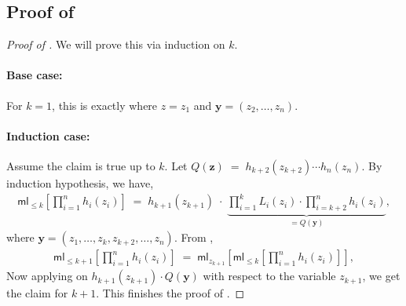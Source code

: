 \documentclass[11pt]{article}
\newcommand{\brac}[1]{\left[ #1 \right]}
\newcommand{\ml}{\mathsf{ml}}
\begin{document}
\subsection{Proof of }\label{app:claim-partial-uni}

\partialmlproduni*

\begin{proof}[Proof of ]
We will prove this via induction on $k$.

\paragraph{Base case:}For $k = 1$, this is exactly  where $z = z_{1}$ and $\mathbf{y} = (z_{2},\ldots,z_{n})$.

\paragraph{Induction case:}Assume the claim is true up to $k$. Let $Q(\mathbf{z}) \; = \; h_{k+2}(z_{k+2}) \cdots h_{n}(z_{n})$. By induction hypothesis, we have,
\begin{align*}
    \ml_{\leq k}\brac{\prod_{i=1}^{n} h_{i}(z_{i})} \; = \; h_{k+1}(z_{k+1}) \; \cdot \; \underbrace{\prod_{i = 1}^{k} L_{i}(z_{i}) \cdot \prod_{i = k+2}^{n} h_{i}(z_{i})}_{= Q(\mathbf{y})},
\end{align*}
where $\mathbf{y} = (z_{1},\ldots,z_{k},z_{k+2},\ldots,z_{n})$. From ,
\begin{align*}
    \ml_{\leq k+1}\brac{\prod_{i=1}^{n} h_{i}(z_{i})} \; = \; \ml_{z_{k+1}}\brac{\ml_{\leq k}\brac{\prod_{i=1}^{n} h_{i}(z_{i})}},
\end{align*}
Now applying  on $h_{k+1}(z_{k+1}) \cdot Q(\mathbf{y})$ with respect to the variable $z_{k+1}$, we get the claim for $k+1$. This finishes the proof of .
\end{proof}
\end{document}
